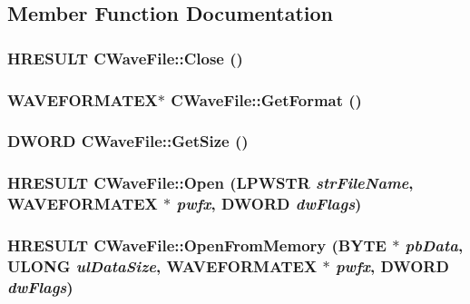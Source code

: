 \subsection{Member Function Documentation}
\hypertarget{class_c_wave_file_a8ff8d99701abd0e8b15972619e6ac951}{
\subsubsection[{Close}]{\setlength{\rightskip}{0pt plus 5cm}HRESULT CWaveFile::Close ()}}
\label{class_c_wave_file_a8ff8d99701abd0e8b15972619e6ac951}
\hypertarget{class_c_wave_file_adb0ec4bcfd6d91248dfe778275928559}{
\subsubsection[{GetFormat}]{\setlength{\rightskip}{0pt plus 5cm}WAVEFORMATEX$\ast$ CWaveFile::GetFormat ()}}
\label{class_c_wave_file_adb0ec4bcfd6d91248dfe778275928559}
\hypertarget{class_c_wave_file_a230c359dba9e652c0468b42345176984}{
\subsubsection[{GetSize}]{\setlength{\rightskip}{0pt plus 5cm}DWORD CWaveFile::GetSize ()}}
\label{class_c_wave_file_a230c359dba9e652c0468b42345176984}
\hypertarget{class_c_wave_file_a14ce677a0c459fd4f1798ff8c2d66005}{
\subsubsection[{Open}]{\setlength{\rightskip}{0pt plus 5cm}HRESULT CWaveFile::Open ({\bf LPWSTR} {\em strFileName}, \/  WAVEFORMATEX $\ast$ {\em pwfx}, \/  DWORD {\em dwFlags})}}
\label{class_c_wave_file_a14ce677a0c459fd4f1798ff8c2d66005}
\hypertarget{class_c_wave_file_abf4405c91380ebd3377f1368b45d7cbb}{
\subsubsection[{OpenFromMemory}]{\setlength{\rightskip}{0pt plus 5cm}HRESULT CWaveFile::OpenFromMemory (BYTE $\ast$ {\em pbData}, \/  ULONG {\em ulDataSize}, \/  WAVEFORMATEX $\ast$ {\em pwfx}, \/  DWORD {\em dwFlags})}}
